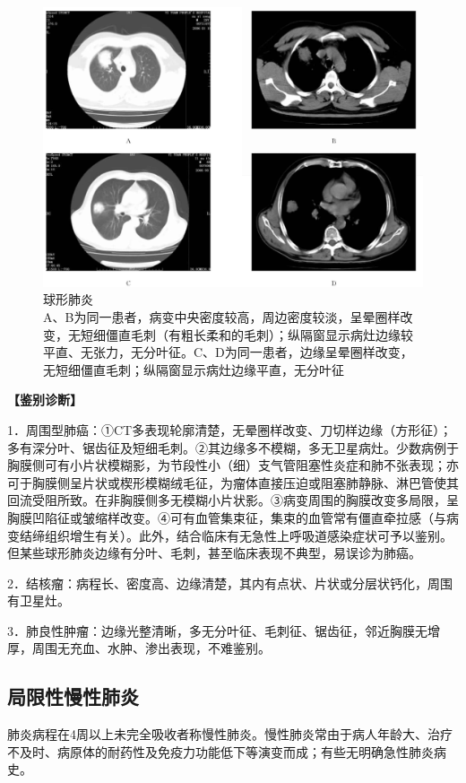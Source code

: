 \begin{figure}[!htbp]
 \centering
 \includegraphics[width=.7\textwidth,height=\textheight,keepaspectratio]{./images/Image00203.jpg}
 \captionsetup{justification=centering}
 \caption{球形肺炎\\{\small A、B为同一患者，病变中央密度较高，周边密度较淡，呈晕圈样改变，无短细僵直毛刺（有粗长柔和的毛刺）；纵隔窗显示病灶边缘较平直、无张力，无分叶征。C、D为同一患者，边缘呈晕圈样改变，无短细僵直毛刺；纵隔窗显示病灶边缘平直，无分叶征}}
 \label{fig9-18}
  \end{figure} 

\textbf{【鉴别诊断】}

1．周围型肺癌：①CT多表现轮廓清楚，无晕圈样改变、刀切样边缘（方形征）；多有深分叶、锯齿征及短细毛刺。②其边缘多不模糊，多无卫星病灶。少数病例于胸膜侧可有小片状模糊影，为节段性小（细）支气管阻塞性炎症和肺不张表现；亦可于胸膜侧呈片状或楔形模糊绒毛征，为瘤体直接压迫或阻塞肺静脉、淋巴管使其回流受阻所致。在非胸膜侧多无模糊小片状影。③病变周围的胸膜改变多局限，呈胸膜凹陷征或皱缩样改变。④可有血管集束征，集束的血管常有僵直牵拉感（与病变结缔组织增生有关）。此外，结合临床有无急性上呼吸道感染症状可予以鉴别。但某些球形肺炎边缘有分叶、毛刺，甚至临床表现不典型，易误诊为肺癌。

2．结核瘤：病程长、密度高、边缘清楚，其内有点状、片状或分层状钙化，周围有卫星灶。

3．肺良性肿瘤：边缘光整清晰，多无分叶征、毛刺征、锯齿征，邻近胸膜无增厚，周围无充血、水肿、渗出表现，不难鉴别。

\subsection{局限性慢性肺炎}

肺炎病程在4周以上未完全吸收者称慢性肺炎。慢性肺炎常由于病人年龄大、治疗不及时、病原体的耐药性及免疫力功能低下等演变而成；有些无明确急性肺炎病史。

